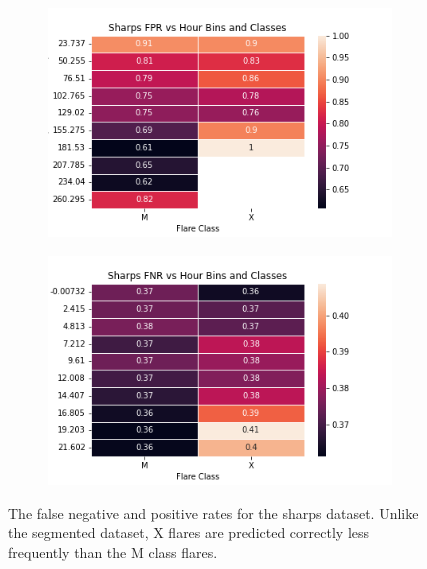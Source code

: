 \begin{figure}[h]
\centering
\begin{subfigure}[b]{.45\textwidth}
    \includegraphics[width=\linewidth]{ThesisFilePkg/figures/findings/sharpsFPR.png}
\end{subfigure}
\begin{subfigure}[b]{.45\textwidth}
    \includegraphics[width=\linewidth]{ThesisFilePkg/figures/findings/sharpsFNR.png}
\end{subfigure}
\label{fig:shpfr}
\caption{The false negative and positive rates for the sharps dataset. Unlike the segmented dataset, X flares are predicted correctly less frequently than the M class flares.}
\end{figure}